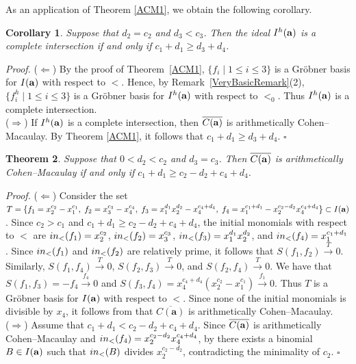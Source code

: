 \documentclass[10pt,a4paper]{amsart}
\newtheorem{thm1}{Theorem}[section]
\newtheorem{cor1}[thm1]{Corollary}
\begin{document}
As an application of Theorem \ref{ACM1}, we obtain the following corollary. 

\begin{cor1} \label{CorCase11CI} Suppose that $d_2=c_2$ and $d_{3}<c_{3}$. Then the ideal $I^{h}({\bf a})$ is a complete intersection if and only if $c_{1}+d_{1} \geq d_{3}+d_{4}$.
\end{cor1}

{\em \noindent Proof.} ($\Leftarrow$) By the proof of Theorem~\ref{ACM1}, $\{f_i \mid 1\le i\le 3\}$ is a Gr\"obner basis for $I({\bf a})$ with respect to $<$. Hence, by Remark~\ref{VeryBasicRemark}(2), $\{f_i^{h} \mid 1\le i\le 3\}$ is a Gr\"obner basis for $I^{h}({\bf a})$ with respect to $<_0$. Thus $I^{h}({\bf a})$ is a complete intersection.\\ ($\Rightarrow$) If $I^{h}({\bf a})$ is a complete intersection, then $\overline{C({\bf a})}$ is arithmetically Cohen--Macaulay. By Theorem \ref{ACM1}, it follows that $c_1+d_{1} \geq d_{3}+d_{4}$. \hfill $\square$ \par\vspace{0.5\baselineskip}


\begin{thm1} \label{ACM2} Suppose that $0<d_2<c_2$ and $d_{3}=c_{3}$. Then $\overline{C({\bf a})}$ is arithmetically Cohen--Macaulay if and only if $c_{1}+d_{1} \geq c_{2}-d_{2}+c_{4}+d_{4}$.
\end{thm1}

{\em \noindent Proof.} ($\Leftarrow$) Consider the set $T=\{f_1=x_2^{c_2}-x_1^{c_1},\; f_2=x_3^{c_3}-x_4^{c_4},\; f_3=x_1^{d_1}x_2^{d_2}-x_4^{c_4+d_4},\; f_4=x_1^{c_1+d_1}-x_2^{c_2-d_2}x_4^{c_4+d_4}\} \subset I({\bf a})$. Since $c_2>c_1$ and $c_1+d_1 \geq c_2-d_2+c_4+d_4$, the initial monomials with respect to $<$ are ${\rm in}_{<}(f_{1})=x_2^{c_2}$, ${\rm in}_{<}(f_{2})=x_3^{c_3}$, ${\rm in}_{<}(f_{3})=x_1^{d_1}x_2^{d_2}$, and ${\rm in}_{<}(f_4)=x_1^{c_1+d_{1}}$. Since ${\rm in}_{<}(f_1)$ and ${\rm in}_{<}(f_2)$ are relatively prime, it follows that $S(f_{1},f_{2}) \stackrel{T}{\longrightarrow} 0$. Similarly, $S(f_{1},f_4) \stackrel{T}{\longrightarrow} 0$, $S(f_{2},f_{3}) \stackrel{T}{\longrightarrow} 0$, and $S(f_{2},f_4) \stackrel{T}{\longrightarrow} 0$. We have that $S(f_{1},f_{3})=-f_4 \stackrel{f_4}{\longrightarrow} 0$ and $S(f_{3},f_4)=x_4^{c_4+d_4}(x_{2}^{c_2}-x_{1}^{c_1}) \stackrel{f_1}{\longrightarrow} 0$. Thus $T$ is a Gr\"obner basis for $I({\bf a})$ with respect to $<$. Since none of the initial monomials is divisible by $x_4$, it follows from \cite[Theorem~2.2]{HerSta} that $\overline{C(\mathbf a)}$ is arithmetically Cohen--Macaulay.\\
($\Rightarrow$) Assume that $c_{1}+d_{1}<c_{2}-d_{2}+c_{4}+d_{4}$. Since $\overline{C({\bf a})}$ is arithmetically Cohen--Macaulay and ${\rm in}_{<}(f_4)=x_2^{c_2-d_2}x_4^{c_4+d_4}$, by \cite[Theorem~2.2]{HerSta} there exists a binomial $B \in I({\bf a})$ such that ${\rm in}_{<}(B)$ divides $x_2^{c_{2}-d_2}$, contradicting the minimality of $c_2$. \hfill $\square$
\end{document}
